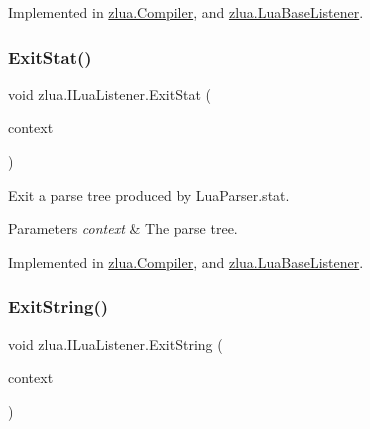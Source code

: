 Implemented in \mbox{\hyperlink{classzlua_1_1_compiler_a53f999661996b7f9c09c021b55545d53}{zlua.\+Compiler}}, and \mbox{\hyperlink{classzlua_1_1_lua_base_listener_a8b590e84f7634f57b233bc7df33591e6}{zlua.\+Lua\+Base\+Listener}}.

\mbox{\label{interfacezlua_1_1_i_lua_listener_adb5cede64711480ae76ce5eece644ee4}} 
\subsubsection{\texorpdfstring{Exit\+Stat()}{ExitStat()}}
{\footnotesize\ttfamily void zlua.\+I\+Lua\+Listener.\+Exit\+Stat (\begin{DoxyParamCaption}\item[{\mbox{[}\+Not\+Null\mbox{]} \mbox{\hyperlink{classzlua_1_1_lua_parser_1_1_stat_context}{Lua\+Parser.\+Stat\+Context}}}]{context }\end{DoxyParamCaption})}



Exit a parse tree produced by Lua\+Parser.\+stat. 


\begin{DoxyParams}{Parameters}
{\em context} & The parse tree.\\
\hline
\end{DoxyParams}


Implemented in \mbox{\hyperlink{classzlua_1_1_compiler_a9133673bbea382a79c9936cd804bd438}{zlua.\+Compiler}}, and \mbox{\hyperlink{classzlua_1_1_lua_base_listener_abf60a39c358a7aafc2ddaa2fbb05d49d}{zlua.\+Lua\+Base\+Listener}}.

\mbox{\label{interfacezlua_1_1_i_lua_listener_afc8e259f5d8629fd2fd800f847dd62a6}} 
\subsubsection{\texorpdfstring{Exit\+String()}{ExitString()}}
{\footnotesize\ttfamily void zlua.\+I\+Lua\+Listener.\+Exit\+String (\begin{DoxyParamCaption}\item[{\mbox{[}\+Not\+Null\mbox{]} \mbox{\hyperlink{classzlua_1_1_lua_parser_1_1_string_context}{Lua\+Parser.\+String\+Context}}}]{context }\end{DoxyParamCaption})}



